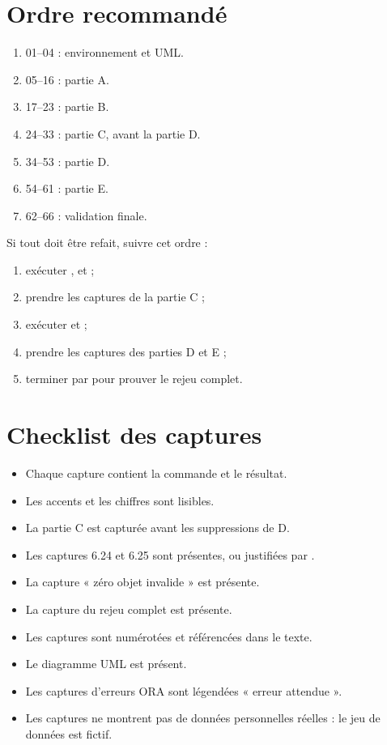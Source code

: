 \section{Ordre recommandé}

\begin{enumerate}
  \item 01--04 : environnement et UML.
  \item 05--16 : partie A.
  \item 17--23 : partie B.
  \item 24--33 : partie C, avant la partie D.
  \item 34--53 : partie D.
  \item 54--61 : partie E.
  \item 62--66 : validation finale.
\end{enumerate}

Si tout doit être refait, suivre cet ordre :

\begin{enumerate}
  \item exécuter ,
         et
         ;
  \item prendre les captures de la partie C ;
  \item exécuter  et
         ;
  \item prendre les captures des parties D et E ;
  \item terminer par  pour prouver le rejeu
        complet.
\end{enumerate}

\section{Checklist des captures}

\begin{itemize}
  \item Chaque capture contient la commande et le résultat.
  \item Les accents et les chiffres sont lisibles.
  \item La partie C est capturée avant les suppressions de D.
  \item Les captures 6.24 et 6.25 sont présentes, ou justifiées par
        .
  \item La capture « zéro objet invalide » est présente.
  \item La capture du rejeu complet est présente.
  \item Les captures sont numérotées et référencées dans le texte.
  \item Le diagramme UML est présent.
  \item Les captures d'erreurs ORA sont légendées « erreur attendue ».
  \item Les captures ne montrent pas de données personnelles réelles : le jeu
        de données est fictif.
\end{itemize}
